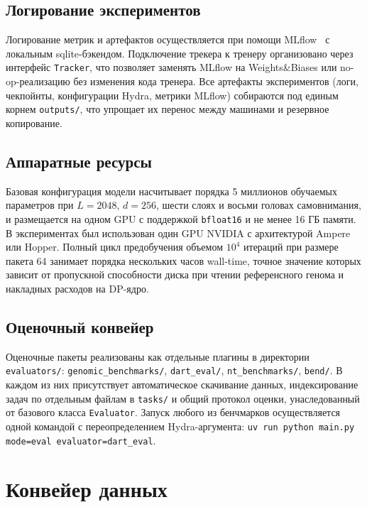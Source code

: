 \subsection{Логирование экспериментов}

Логирование метрик и артефактов осуществляется при помощи
MLflow~\cite{Zaharia_Accelerating_the_Machine_2018} с локальным
sqlite-бэкендом. Подключение трекера к тренеру организовано через
интерфейс \texttt{Tracker}, что позволяет заменять MLflow на
Weights\&Biases или no-op-реализацию без изменения кода тренера. Все
артефакты экспериментов (логи, чекпойнты, конфигурации Hydra, метрики
MLflow) собираются под единым корнем \texttt{outputs/}, что упрощает
их перенос между машинами и резервное копирование.

\subsection{Аппаратные ресурсы}

Базовая конфигурация модели насчитывает порядка 5 миллионов
обучаемых параметров при $L = 2048$, $d = 256$, шести слоях и восьми
головах самовнимания, и размещается на одном GPU с поддержкой
\texttt{bfloat16} и не менее 16 ГБ памяти. В экспериментах был
использован один GPU NVIDIA с архитектурой Ampere или Hopper. Полный
цикл предобучения объемом $10^4$ итераций при размере пакета 64
занимает порядка нескольких часов wall-time, точное значение которых
зависит от пропускной способности диска при чтении референсного
генома и накладных расходов на DP-ядро.

\subsection{Оценочный конвейер}

Оценочные пакеты реализованы как отдельные плагины в директории
\texttt{evaluators/}: \texttt{genomic\_benchmarks/}, \texttt{dart\_eval/},
\texttt{nt\_benchmarks/}, \texttt{bend/}. В каждом из них присутствует
автоматическое скачивание данных, индексирование задач по отдельным
файлам в \texttt{tasks/} и общий протокол оценки, унаследованный от
базового класса \texttt{Evaluator}. Запуск любого из бенчмарков
осуществляется одной командой с переопределением Hydra-аргумента:
\texttt{uv run python main.py mode=eval evaluator=dart\_eval}.

\section{Конвейер данных}

